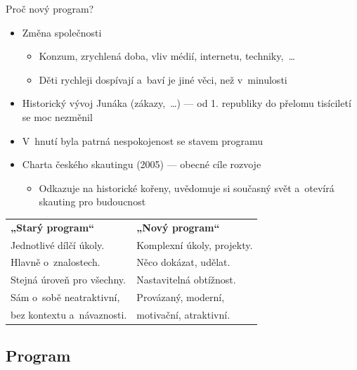 \documentclass[compress, ucs, xelatex, xcolor=dvipsnames, print,
  hyperref={
    bookmarks=true,
    unicode=true,
    colorlinks=true,
    plainpages=false,
    pdfkeywords={Skaut, Junak, Skauting, Vychovna metoda},
    linkcolor=Black,
    anchorcolor=Black,
    citecolor=OliveGreen,
    filecolor=OliveGreen,
    menucolor=Black,
    urlcolor=OliveGreen,
    pdftex}
  ]{beamer}
\begin{document}
\begin{frame}{Proč nový program?}
  \begin{itemize}
    \item Změna společnosti
    \begin{itemize}
      \item Konzum, zrychlená doba, vliv médií, internetu, techniky,~\ldots
      \item Děti rychleji dospívají a~baví je jiné věci, než v~minulosti
    \end{itemize}
    \item Historický vývoj Junáka (zákazy,~\ldots) --- od 1. republiky do přelomu tisíciletí se moc nezměnil
    \item V~hnutí byla patrná nespokojenost se stavem programu
    \item Charta českého skautingu (2005) --- obecné cíle rozvoje
    \begin{itemize}
      \item Odkazuje na historické kořeny, uvědomuje si současný svět a~otevírá skauting pro budoucnost
    \end{itemize}
  \end{itemize}
  \begin{center}
    \begin{tabular}{ll}
      \textbf{„Starý program“} & \textbf{„Nový program“}\\
      Jednotlivé dílčí úkoly. & Komplexní úkoly, projekty.\\
      Hlavně o~znalostech. & Něco dokázat, udělat.\\
      Stejná úroveň pro všechny. & Nastavitelná obtížnost.\\
      Sám o~sobě neatraktivní, & Provázaný, moderní,\\
      bez kontextu a~návaznosti. & motivační, atraktivní.
    \end{tabular}
  \end{center}
\end{frame}

\subsection{Program}
\end{document}
